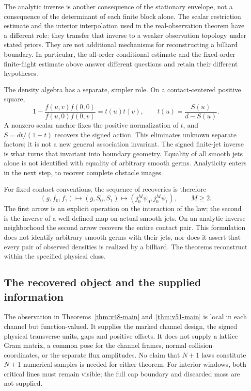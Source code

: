 The analytic inverse is another consequence of the stationary envelope,
not a consequence of the determinant of each finite block alone.
The scalar restriction estimate and the interior interpolation used in
the real-observation theorem have a different role: they transfer that
inverse to a weaker observation topology under stated priors.  They are
not additional mechanisms for reconstructing a billiard boundary.
In particular, the all-order conditional estimate and the fixed-order
finite-flight estimate above answer different questions and retain their
different hypotheses.

The density algebra has a separate, simpler role.  On a contact-centered
positive square,
\[
 1-\frac{f(u,v)f(0,0)}{f(u,0)f(0,v)}=t(u)t(v),
 \qquad t(u)=\frac{S(u)}{d-S(u)}.
\]
A nonzero scalar anchor fixes the positive normalization of $t$, and
$S=dt/(1+t)$ recovers the signed action.  This eliminates unknown
separate factors; it is not a new general association invariant.
The signed finite-jet inverse is what turns that invariant into
boundary geometry.  Equality of all smooth jets alone is not identified
with equality of arbitrary smooth germs.  Analyticity enters in the
next step, to recover complete obstacle images.


For fixed contact conventions, the sequence of recoveries is therefore
\[
 (g,f_0,f_1)\longmapsto(g,S_0,S_1)
       \longmapsto (j_0^M\psi_0,j_0^M\psi_1),\qquad M\ge2.
\]
The first arrow is an explicit operation on the interaction of the law;
the second is the inverse of a well-defined map on actual smooth jets.
On an analytic inverse neighborhood the second arrow recovers the entire
contact pair.  This formulation does not identify arbitrary smooth germs
with their jets, nor does it assert that every pair of observed densities
is realized by a billiard.  The theorems reconstruct within the specified
physical class.



\subsection{The recovered object and the supplied information}

The observation in Theorems~\ref{thm:v48-main} and~\ref{thm:v51-main}
is local in each channel but function-valued.  It supplies the marked
channel design, the signed physical transverse units, gaps and positive
offsets.  It does not supply a lattice Gram matrix, a common pose for
the channel frames, normal collision coordinates, or the separate flux
amplitudes.  No claim that $N+1$ laws constitute $N+1$ numerical samples
is needed for either theorem.  For interior windows, both critical
lines must remain visible; the full cap boundary and discarded mass
are not supplied.

